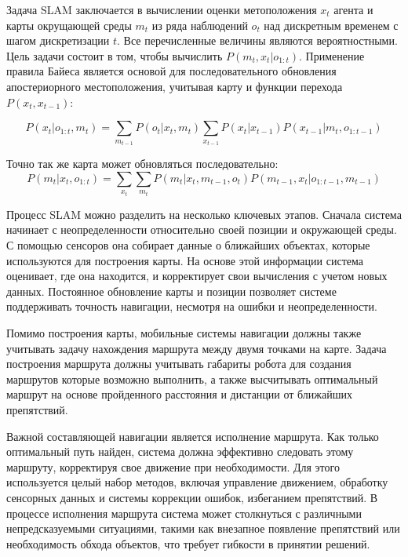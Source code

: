 
Задача SLAM заключается в вычислении оценки метоположения $x_t$ агента и карты
окрущающей среды $m_t$ из ряда наблюдений $o_t$ над дискретным временем с шагом
дискретизации $t$. Все перечисленные величины являются вероятностными. Цель
задачи состоит в том, чтобы вычислить $P(m_t, x_t | o_{1:t})$. Применение правила
Байеса является основой для последовательного обновления апостериорного
местоположения, учитывая карту и функции перехода~$P(x_t, x_{t-1})$:

\begin{equation}
P(x_t | o_{1:t}, m_t) = \sum_{m_{t-1}} P(o_t | x_t, m_t) \sum_{x_{t-1}} P(x_t |
	x_{t-1}) P(x_{t-1} | m_t, o_{1:t-1})
\end{equation}

Точно так же карта может обновляться последовательно:
\begin{equation}
P(m_t | x_t, o_{1:t}) = \sum_{x_t} \sum_{m_t} P(m_t | x_t, m_{t-1}, o_t)
	P(m_{t-1}, x_t | o_{1:t-1}, m_{t-1})
\end{equation}

Процесс SLAM можно разделить на несколько ключевых этапов. Сначала система
начинает с неопределенности относительно своей позиции и окружающей среды. С
помощью сенсоров она собирает данные о ближайших объектах, которые используются
для построения карты. На основе этой информации система оценивает, где она
находится, и корректирует свои вычисления с учетом новых данных. Постоянное
обновление карты и позиции позволяет системе поддерживать точность навигации,
несмотря на ошибки и неопределенности.

Помимо построения карты, мобильные системы навигации должны также учитывать
задачу нахождения маршрута между двумя точками на карте. Задача построения
маршрута должны учитывать габариты робота для создания маршрутов которые
возможно выполнить, а также высчитывать оптимальный маршрут на основе
пройденного расстояния и дистанции от ближайших препятствий.

Важной составляющей навигации является исполнение маршрута. Как только
оптимальный путь найден, система должна эффективно следовать этому маршруту,
корректируя свое движение при необходимости. Для этого используется целый набор
методов, включая управление движением, обработку сенсорных данных и системы
коррекции ошибок, избеганием препятствий. В процессе исполнения маршрута система
может столкнуться с различными непредсказуемыми ситуациями, такими как внезапное
появление препятствий или необходимость обхода объектов, что требует гибкости в
принятии решений.

